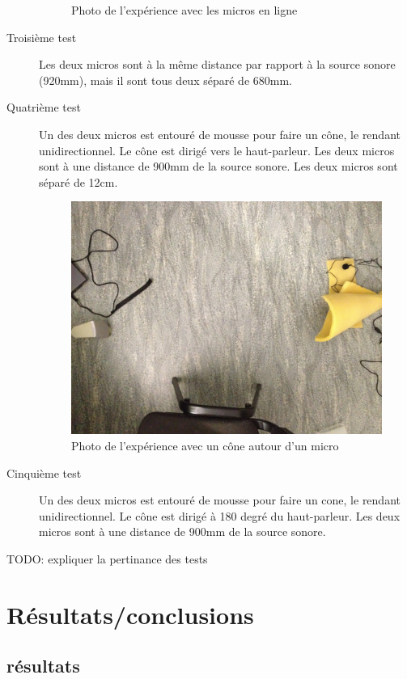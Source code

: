 \documentclass[12pt,a4paper]{report}
\begin{document}
\begin{description}
\begin{figure}[H]
	\caption{Photo de l'expérience avec les micros en ligne}
	\end{figure}
\item[Troisième test] Les deux micros sont à la même distance par rapport à la source sonore (920mm), mais il sont tous deux séparé de 680mm.
\item[Quatrième test] Un des deux micros est entouré de mousse pour faire un cône, le rendant unidirectionnel. Le cône est dirigé vers le haut-parleur. Les deux micros sont à une distance de 900mm de la source sonore. Les deux micros sont séparé de 12cm.
	\begin{figure}[H]
	\includegraphics[width=\textwidth]{../tests/lecture_de_signaux_carres/donnees11-03/test_4.jpg} 
	\caption{Photo de l'expérience avec un cône autour d'un micro}
	\end{figure}
\item[Cinquième test]	Un des deux micros est entouré de mousse pour faire un cone, le rendant unidirectionnel. Le cône est dirigé à 180 degré du haut-parleur. Les deux micros sont à une distance de 900mm de la source sonore.
\end{description}

\begin{huge}
TODO: expliquer la pertinance des tests
\end{huge}

\section{Résultats/conclusions}
\subsection{résultats}
\end{document}
